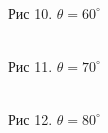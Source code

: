 \documentclass[12pt]{article}
\begin{document}
  \begin{figure}[h!]
    \begin{minipage}[h]{0.32\linewidth}
      \\
      Рис 10. $\theta = 60^{\circ}$
    \end{minipage}
    \begin{minipage}[h]{0.32\linewidth}
      \\
      Рис 11. $\theta = 70^{\circ}$
    \end{minipage}
    \begin{minipage}[h]{0.32\linewidth}
      \\
      Рис 12. $\theta = 80^{\circ}$
    \end{minipage}
  \end{figure}
\end{document}
